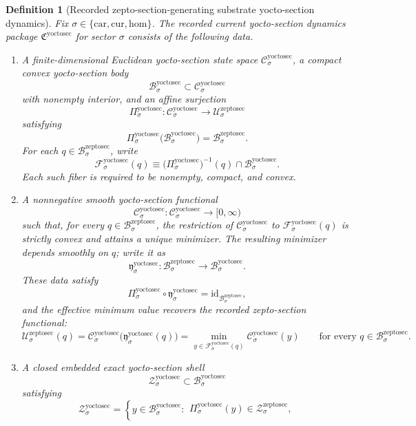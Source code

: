 \documentclass[11pt]{article}
\newcommand{\Car}{\mathrm{car}}
\newcommand{\Cur}{\mathrm{cur}}
\newcommand{\Hom}{\mathrm{hom}}
\newcommand{\ZeptoSectionSpace}[1]{\mathcal U_{#1}^{\mathrm{zeptosec}}}
\newcommand{\ZeptoSectionBody}[1]{\mathcal B_{#1}^{\mathrm{zeptosec}}}
\newcommand{\ZeptoSectionFunctional}[1]{\mathscr U_{#1}^{\mathrm{zeptosec}}}
\newcommand{\ZeptoSectionShell}[1]{\mathcal Z_{#1}^{\mathrm{zeptosec}}}
\newcommand{\YoctoSectionPackage}{\mathfrak C^{\mathrm{yoctosec}}}
\newcommand{\YoctoSectionSpace}[1]{\mathcal C_{#1}^{\mathrm{yoctosec}}}
\newcommand{\YoctoSectionBody}[1]{\mathcal B_{#1}^{\mathrm{yoctosec}}}
\newcommand{\YoctoSectionProj}[1]{\Pi_{#1}^{\mathrm{yoctosec}}}
\newcommand{\YoctoSectionFiber}[2]{\mathcal F_{#1}^{\mathrm{yoctosec}}(#2)}
\newcommand{\YoctoSectionZeptoMin}[1]{\mathfrak y_{#1}^{\mathrm{yoctosec}}}
\newcommand{\YoctoSectionFunctional}[1]{\mathscr C_{#1}^{\mathrm{yoctosec}}}
\newcommand{\YoctoSectionShell}[1]{\mathcal Z_{#1}^{\mathrm{yoctosec}}}
\newtheorem{definition}{Definition}
\begin{document}
\begin{definition}[Recorded zepto-section-generating substrate yocto-section dynamics]
\label{def:yoctosec}
Fix \(\sigma\in\{\Car,\Cur,\Hom\}\). The recorded current yocto-section dynamics package \(\YoctoSectionPackage\) for sector \(\sigma\) consists of the following data.
\begin{enumerate}
    \item A finite-dimensional Euclidean yocto-section state space \(\YoctoSectionSpace{\sigma}\), a compact convex yocto-section body
    \[
    \YoctoSectionBody{\sigma}\subset\YoctoSectionSpace{\sigma}
    \]
    with nonempty interior, and an affine surjection
    \[
    \YoctoSectionProj{\sigma}:\YoctoSectionSpace{\sigma}\to\ZeptoSectionSpace{\sigma}
    \]
    satisfying
    \[
    \YoctoSectionProj{\sigma}\bigl(\YoctoSectionBody{\sigma}\bigr)=\ZeptoSectionBody{\sigma}.
    \]
    For each \(q\in\ZeptoSectionBody{\sigma}\), write
    \[
    \YoctoSectionFiber{\sigma}{q}
    \equiv
    \bigl(\YoctoSectionProj{\sigma}\bigr)^{-1}(q)\cap\YoctoSectionBody{\sigma}.
    \]
    Each such fiber is required to be nonempty, compact, and convex.
    \item A nonnegative smooth yocto-section functional
    \[
    \YoctoSectionFunctional{\sigma}:\YoctoSectionSpace{\sigma}\to[0,\infty)
    \]
    such that, for every \(q\in\ZeptoSectionBody{\sigma}\), the restriction of \(\YoctoSectionFunctional{\sigma}\) to \(\YoctoSectionFiber{\sigma}{q}\) is strictly convex and attains a unique minimizer. The resulting minimizer depends smoothly on \(q\); write it as
    \[
    \YoctoSectionZeptoMin{\sigma}:\ZeptoSectionBody{\sigma}\to\YoctoSectionBody{\sigma}.
    \]
    These data satisfy
    \[
    \YoctoSectionProj{\sigma}\circ\YoctoSectionZeptoMin{\sigma}
    =
    \mathrm{id}_{\ZeptoSectionBody{\sigma}},
    \]
    and the effective minimum value recovers the recorded zepto-section functional:
    \[
    \ZeptoSectionFunctional{\sigma}(q)
    =
    \YoctoSectionFunctional{\sigma}\bigl(\YoctoSectionZeptoMin{\sigma}(q)\bigr)
    =
    \min_{y\in\YoctoSectionFiber{\sigma}{q}}
    \YoctoSectionFunctional{\sigma}(y)
    \qquad
    \text{for every }
    q\in\ZeptoSectionBody{\sigma}.
    \]
    \item A closed embedded exact yocto-section shell
    \[
    \YoctoSectionShell{\sigma}\subset\YoctoSectionBody{\sigma}
    \]
    satisfying
    \[
    \YoctoSectionShell{\sigma}
    =
    \left\{
    y\in\YoctoSectionBody{\sigma}:
    \begin{array}{l}
    \YoctoSectionProj{\sigma}(y)\in\ZeptoSectionShell{\sigma},\\[0.2em]

\end{array}\]
\end{enumerate}
\end{definition}
\end{document}
